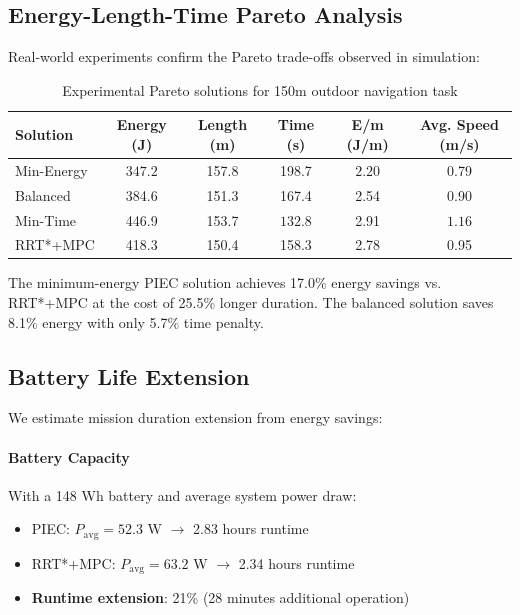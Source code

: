 \subsection{Energy-Length-Time Pareto Analysis}

Real-world experiments confirm the Pareto trade-offs observed in simulation:

\begin{table}[htbp]
\centering
\caption{Experimental Pareto solutions for 150m outdoor navigation task}
\label{tab:exp_pareto_solutions}
\begin{tabular}{lccccc}
\toprule
\textbf{Solution} & \textbf{Energy (J)} & \textbf{Length (m)} & \textbf{Time (s)} & \textbf{E/m (J/m)} & \textbf{Avg. Speed (m/s)} \\
\midrule
Min-Energy & $\mathbf{347.2}$ & 157.8 & 198.7 & $\mathbf{2.20}$ & 0.79 \\
Balanced & 384.6 & 151.3 & 167.4 & 2.54 & 0.90 \\
Min-Time & 446.9 & 153.7 & $\mathbf{132.8}$ & 2.91 & $\mathbf{1.16}$ \\
\midrule
RRT*+MPC & 418.3 & 150.4 & 158.3 & 2.78 & 0.95 \\
\bottomrule
\end{tabular}
\end{table}

The minimum-energy PIEC solution achieves 17.0\% energy savings vs. RRT*+MPC at the cost of 25.5\% longer duration. The balanced solution saves 8.1\% energy with only 5.7\% time penalty.


\subsection{Battery Life Extension}

We estimate mission duration extension from energy savings:

\paragraph{Battery Capacity}
With a 148 Wh battery and average system power draw:
\begin{itemize}
    \item PIEC: $P_{\text{avg}} = 52.3$ W $\rightarrow$ 2.83 hours runtime
    \item RRT*+MPC: $P_{\text{avg}} = 63.2$ W $\rightarrow$ 2.34 hours runtime
    \item \textbf{Runtime extension}: 21\% (28 minutes additional operation)
\end{itemize}

